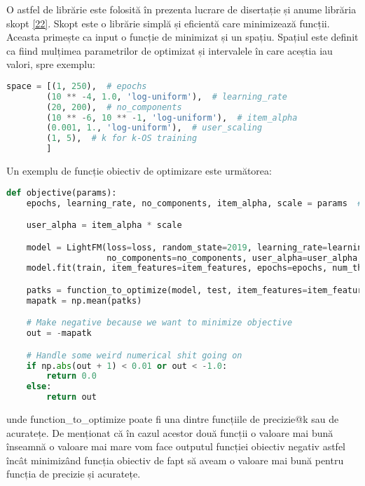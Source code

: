 O astfel de librărie este folosită în prezenta lucrare de disertație și anume librăria skopt \hyperlink{skopt}{[22]}. Skopt este o librărie simplă și eficientă care minimizează funcții. Aceasta primește ca input o funcție de minimizat și un spațiu. Spațiul este definit ca fiind mulțimea parametrilor de optimizat și intervalele în care aceștia iau valori, spre exemplu:
\begin{lstlisting}[language=Python, caption=Spațiul parametrilor de optimizat]
space = [(1, 250),  # epochs
        (10 ** -4, 1.0, 'log-uniform'),  # learning_rate
        (20, 200),  # no_components
        (10 ** -6, 10 ** -1, 'log-uniform'),  # item_alpha
        (0.001, 1., 'log-uniform'),  # user_scaling
        (1, 5),  # k for k-OS training
        ] 
\end{lstlisting}

Un exemplu de funcție obiectiv de optimizare este următorea:
\begin{lstlisting}[language=Python, caption=Funcția obiectiv]
def objective(params):
    epochs, learning_rate, no_components, item_alpha, scale = params  # 'k_os'

    user_alpha = item_alpha * scale

    model = LightFM(loss=loss, random_state=2019, learning_rate=learning_rate,
                    no_components=no_components, user_alpha=user_alpha, item_alpha=item_alpha)
    model.fit(train, item_features=item_features, epochs=epochs, num_threads=threads, verbose=True)

    patks = function_to_optimize(model, test, item_features=item_features, num_threads=threads)
    mapatk = np.mean(patks)

    # Make negative because we want to minimize objective
    out = -mapatk

    # Handle some weird numerical shit going on
    if np.abs(out + 1) < 0.01 or out < -1.0:
        return 0.0
    else:
        return out
\end{lstlisting}
unde function\_to\_optimize poate fi una dintre funcțiile de precizie@k sau de acuratețe. De menționat că în cazul acestor două funcții o valoare mai bună înseamnă o valoare mai mare vom face outputul funcției obiectiv negativ astfel încât minimizând funcția obiectiv de fapt să aveam o valoare mai bună pentru funcția de precizie și acuratețe.

